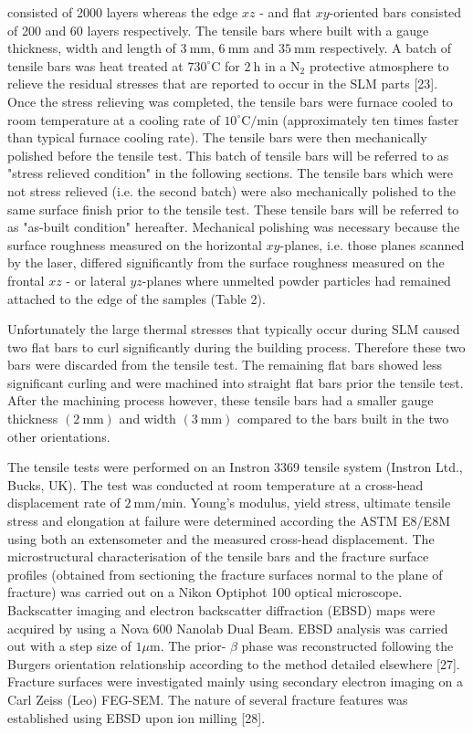 \documentclass[10pt]{article}
\begin{document}
consisted of 2000 layers whereas the edge $x z$ - and flat $x y$-oriented bars consisted of 200 and 60 layers respectively. The tensile bars where built with a gauge thickness, width and length of $3 \mathrm{~mm}$, $6 \mathrm{~mm}$ and $35 \mathrm{~mm}$ respectively. A batch of tensile bars was heat treated at $730^{\circ} \mathrm{C}$ for $2 \mathrm{~h}$ in a $\mathrm{N}_{2}$ protective atmosphere to relieve the residual stresses that are reported to occur in the SLM parts [23]. Once the stress relieving was completed, the tensile bars were furnace cooled to room temperature at a cooling rate of $10^{\circ} \mathrm{C} / \mathrm{min}$ (approximately ten times faster than typical furnace cooling rate). The tensile bars were then mechanically polished before the tensile test. This batch of tensile bars will be referred to as "stress relieved condition" in the following sections. The tensile bars which were not stress relieved (i.e. the second batch) were also mechanically polished to the same surface finish prior to the tensile test. These tensile bars will be referred to as "as-built condition" hereafter. Mechanical polishing was necessary because the surface roughness measured on the horizontal $x y$-planes, i.e. those planes scanned by the laser, differed significantly from the surface roughness measured on the frontal $x z$ - or lateral $y z$-planes where unmelted powder particles had remained attached to the edge of the samples (Table 2).

Unfortunately the large thermal stresses that typically occur during SLM caused two flat bars to curl significantly during the building process. Therefore these two bars were discarded from the tensile test. The remaining flat bars showed less significant curling and were machined into straight flat bars prior the tensile test. After the machining process however, these tensile bars had a smaller gauge thickness $(2 \mathrm{~mm})$ and width $(3 \mathrm{~mm})$ compared to the bars built in the two other orientations.

The tensile tests were performed on an Instron 3369 tensile system (Instron Ltd., Bucks, UK). The test was conducted at room temperature at a cross-head displacement rate of $2 \mathrm{~mm} / \mathrm{min}$. Young's modulus, yield stress, ultimate tensile stress and elongation at failure were determined according the ASTM E8/E8M using both an extensometer and the measured cross-head displacement. The microstructural characterisation of the tensile bars and the fracture surface profiles (obtained from sectioning the fracture surfaces normal to the plane of fracture) was carried out on a Nikon Optiphot 100 optical microscope. Backscatter imaging and electron backscatter diffraction (EBSD) maps were acquired by using a Nova 600 Nanolab Dual Beam. EBSD analysis was carried out with a step size of $1 \mu \mathrm{m}$. The prior- $\beta$ phase was reconstructed following the Burgers orientation relationship according to the method detailed elsewhere [27]. Fracture surfaces were investigated mainly using secondary electron imaging on a Carl Zeiss (Leo) FEG-SEM. The nature of several fracture features was established using EBSD upon ion milling [28].
\end{document}

